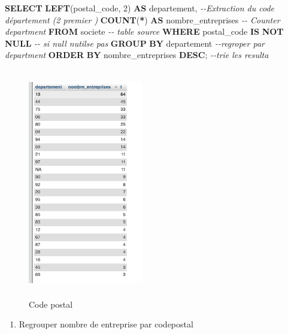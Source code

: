 \documentclass[mstat,12pt]{unswthesis}
\newenvironment{Shaded}{\begin{snugshade}}{\end{snugshade}}
\newcommand{\CommentTok}[1]{\textcolor[rgb]{0.56,0.35,0.01}{\textit{#1}}}
\newcommand{\DecValTok}[1]{\textcolor[rgb]{0.00,0.00,0.81}{#1}}
\newcommand{\FunctionTok}[1]{\textcolor[rgb]{0.13,0.29,0.53}{\textbf{#1}}}
\newcommand{\KeywordTok}[1]{\textcolor[rgb]{0.13,0.29,0.53}{\textbf{#1}}}
\newcommand{\NormalTok}[1]{#1}
\newcommand{\OperatorTok}[1]{\textcolor[rgb]{0.81,0.36,0.00}{\textbf{#1}}}
\begin{document}
\begin{Shaded}
\begin{Highlighting}[]

\KeywordTok{SELECT} 
    \KeywordTok{LEFT}\NormalTok{(postal\_code, }\DecValTok{2}\NormalTok{) }\KeywordTok{AS}\NormalTok{ departement,  }\CommentTok{{-}{-}Extraction du code département (2 premier )}
    \FunctionTok{COUNT}\NormalTok{(}\OperatorTok{*}\NormalTok{) }\KeywordTok{AS}\NormalTok{ nombre\_entreprises        }\CommentTok{{-}{-} Counter department}
\KeywordTok{FROM} 
\NormalTok{    societe }\CommentTok{{-}{-} table source}
\KeywordTok{WHERE} 
\NormalTok{    postal\_code }\KeywordTok{IS} \KeywordTok{NOT} \KeywordTok{NULL} \CommentTok{{-}{-} si null n\textquotesingle{}utilse pas}
\KeywordTok{GROUP} \KeywordTok{BY} 
\NormalTok{    departement }\CommentTok{{-}{-}regroper par department}
\KeywordTok{ORDER} \KeywordTok{BY} 
\NormalTok{    nombre\_entreprises }\KeywordTok{DESC}\NormalTok{; }\CommentTok{{-}{-}trie les resulta }
\end{Highlighting}
\end{Shaded}

\begin{figure}
\centering
\includegraphics[width=5cm,height=10cm]{image_sql/sql_1_Serdar.png}
\caption{Code postal}
\end{figure}

\newpage

\begin{enumerate}
\def\labelenumi{\arabic{enumi})}
\setcounter{enumi}{1}
\tightlist
\item
  Regrouper nombre de entreprise par codepostal
\end{enumerate}
\end{document}

